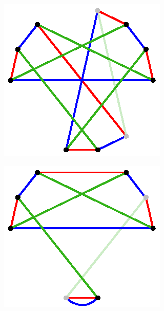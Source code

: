 \documentclass[11pt, oneside]{amsart}
\theoremstyle{theorem}
\theoremstyle{definition}
\theoremstyle{theorem}
\begin{document}
\begin{figure}[h!]
\begin{subfigure}{.24\textwidth}
  \centering
  \includegraphics[width=.9\linewidth]{heawood3.eps}
  \label{ox3}
\end{subfigure}%
\begin{subfigure}{.24\textwidth}
  \centering
  \includegraphics[width=.9\linewidth]{heawood4.eps}
  \label{ox4}
\end{subfigure}
\begin{subfigure}{.24\textwidth}
  \centering

\end{subfigure}
\end{figure}
\end{document}
